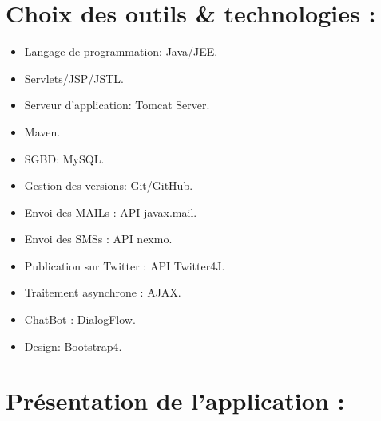 \documentclass[12pt,a4paper,twoside]{report}
\begin{document}
	\section{Choix des outils \& technologies :}{
			\begin{itemize}[label=\textbullet]
				\item Langage de programmation: Java/JEE.
				\item Servlets/JSP/JSTL.
				\item Serveur d'application: Tomcat Server.
				\item Maven.
				\item SGBD: MySQL.
				\item Gestion des versions: Git/GitHub.
				\item Envoi des MAILs : API javax.mail.
				\item Envoi des SMSs : API nexmo.
				\item Publication sur Twitter : API Twitter4J.
				\item Traitement asynchrone : AJAX.
				\item ChatBot : DialogFlow.
				\item Design: Bootstrap4.
			\end{itemize}
	}
	\section{Présentation de l'application :}{
	}
\end{document}
